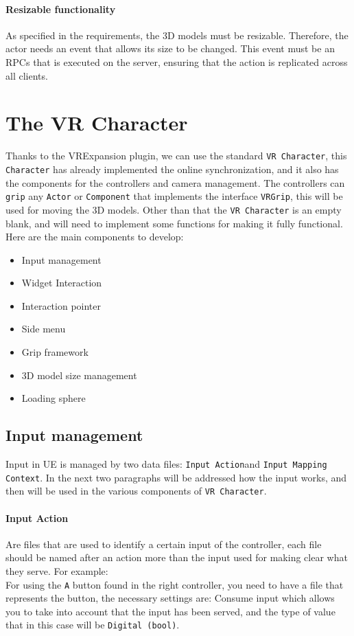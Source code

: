 \paragraph{Resizable functionality}
As specified in the requirements, the 3D models must be resizable. Therefore, the actor needs an event that allows its size to be changed. This event must be an \ac{RPCs} that is executed on the server, ensuring that the action is replicated across all clients.

\section{The VR Character}
\noindent
Thanks to the VRExpansion plugin, we can use the standard \texttt{VR Character}, this \texttt{Character} has already implemented the online synchronization, and it also has the components for the controllers and camera management.
The controllers can \texttt{grip} any \texttt{Actor} or \texttt{Component} that implements the interface \texttt{VRGrip}, this will be used for  moving the 3D models.
Other than that the \texttt{VR Character} is an empty blank, and will need to implement some functions for making it fully functional.\\
Here are the main components to develop:

\begin{itemize}
    \item Input management
    \item Widget Interaction
    \item Interaction pointer
    \item Side menu
    \item Grip framework
    \item 3D model size management    
    \item Loading sphere
\end{itemize}

\subsection{Input management}
\noindent
Input in \ac{UE} is managed by two data files: \texttt{Input Action}and \texttt{Input Mapping Context}.
In the next two paragraphs will be addressed how the input works, and then will be used in the various components of \texttt{VR Character}.

\paragraph{Input Action}
Are files that are used to identify a certain input of the controller, each file should be named after an action more than the input used for making clear what they serve.
For example:\\
For using the \texttt{A} button found in the right controller,
you need to have a file that represents the button,
the necessary settings are: Consume input which allows you to take into account that the input has been served,
and the type of value that in this case will be \texttt{Digital (bool)}.

